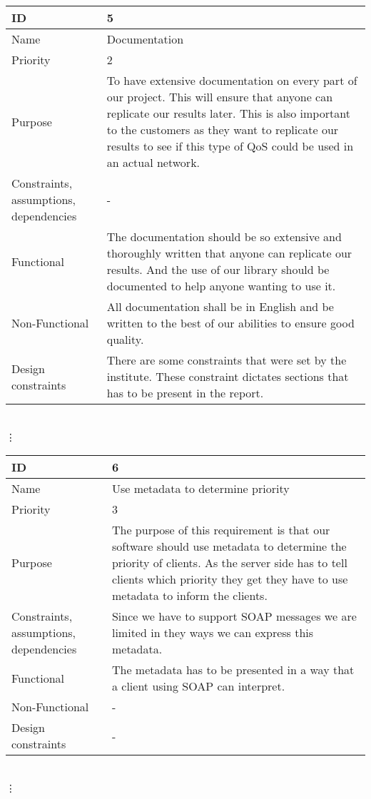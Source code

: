 \begin{tabular}{| p{4cm} | p{8cm} |}
    \hline
    ID & 5 \\
    \hline
    Name & Documentation  \\
    \hline
    Priority & 2 \\
    \hline
    Purpose & To have extensive documentation on every part of our project. This will ensure that anyone can replicate our results later. This is also important to the customers as they want to replicate our results to see if this type of QoS could be used in an actual network.\\
    \hline 
    Constraints, assumptions, dependencies & -\\
    \hline  
    Functional & The documentation should be so extensive and thoroughly written that anyone can replicate our results. And the use of our library should be documented to help anyone wanting to use it. \\
    \hline
    Non-Functional & All documentation shall be in English and be written to the best of our abilities to ensure good quality. \\ 
    \hline
    Design constraints & There are some constraints that were set by the institute. These constraint dictates sections that has to be present in the report. \\
    \hline
\end{tabular}
\\  \vdots  \\

\begin{tabular}{| p{4cm} | p{8cm} |}
    \hline
    ID & 6 \\
    \hline
    Name & Use metadata to determine priority  \\
    \hline
    Priority & 3 \\
    \hline
    Purpose & The purpose of this requirement is that our software should use metadata to determine the priority of clients. As the server side has to tell clients which priority they get they have to use metadata to inform the clients. \\
    \hline 
    Constraints, assumptions, dependencies & Since we have to support SOAP messages we are limited in they ways we can express this metadata. \\
    \hline  
    Functional & The metadata has to be presented in a way that a client using SOAP can interpret. \\
    \hline
    Non-Functional & -\\ 
    \hline
    Design constraints & -\\
    \hline
\end{tabular}
\\  \vdots  \\

